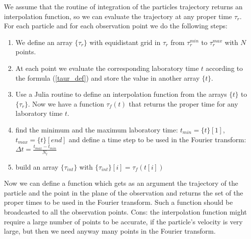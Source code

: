     \begin{tcolorbox}[colback=blue!5!white,colframe=blue!75!black]
        We assume that the routine of integration of the particles trajectory returns an interpolation function, so we can evaluate the trajectory at any proper time $\tau_r$.
        For each particle and for each observation point we do the following steps:
\begin{enumerate}
\item We define an array $\{\tau_r\}$ with equidistant grid in $\tau_r$ from $\tau_r^{min}$ to $\tau_r^{max}$ with $N$ points.
\item At each point we evaluate the corresponding laboratory time $t$ according to the formula (\ref{taur_def}) and store the value in another array $\{t\}$.
\item Use a Julia routine to define an interpolation function from the arrays $\{t\}$ to $\{\tau_r\}$. Now we have a function $\tau_{f}(t)$ that returns the proper time for any laboratory time $t$.
\item find the minimum and the maximum laboratory time: $t_{min}=\{t\}[1]$, $t_{max}=\{t\}[end]$ and define a time step to be used in the Fourier transform: $\Delta t = \frac{t_{max}-t_{min}}{N_t}$
\item build an array $\{\tau_{int}\}$ with $\{\tau_{int}\}[i]=\tau_{f}(t[i])$
\end{enumerate}
Now we can define a function which gets as an argument the trajectory of the particle and the point in the plane of the observation and returns the set of the proper times to be used in the Fourier transform. Such a function should be broadcasted to all the observation points.  Cons: the interpolation function might require a large number of points to be accurate, if the particle's velocity is very large, but then we need anyway many points in the Fourier transform.
    \end{tcolorbox}
    